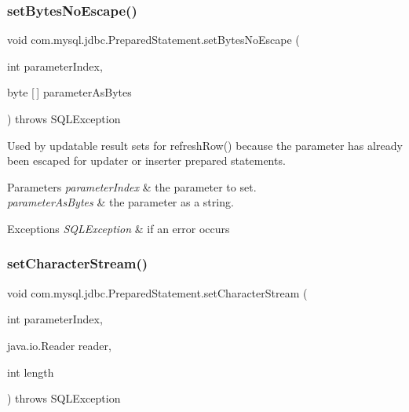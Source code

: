 \mbox{\label{classcom_1_1mysql_1_1jdbc_1_1_prepared_statement_ae6f08c22768c05382f813b02cfdb81e8}} 
\subsubsection{\texorpdfstring{set\+Bytes\+No\+Escape()}{setBytesNoEscape()}}
{\footnotesize\ttfamily void com.\+mysql.\+jdbc.\+Prepared\+Statement.\+set\+Bytes\+No\+Escape (\begin{DoxyParamCaption}\item[{int}]{parameter\+Index,  }\item[{byte \mbox{[}$\,$\mbox{]}}]{parameter\+As\+Bytes }\end{DoxyParamCaption}) throws S\+Q\+L\+Exception\hspace{0.3cm}{\ttfamily [protected]}}

Used by updatable result sets for refresh\+Row() because the parameter has already been escaped for updater or inserter prepared statements.


\begin{DoxyParams}{Parameters}
{\em parameter\+Index} & the parameter to set. \\
\hline
{\em parameter\+As\+Bytes} & the parameter as a string.\\
\hline
\end{DoxyParams}

\begin{DoxyExceptions}{Exceptions}
{\em S\+Q\+L\+Exception} & if an error occurs \\
\hline
\end{DoxyExceptions}
\mbox{\label{classcom_1_1mysql_1_1jdbc_1_1_prepared_statement_a3653eef6d3825664b0dd3f0adbe8288c}} 
\subsubsection{\texorpdfstring{set\+Character\+Stream()}{setCharacterStream()}}
{\footnotesize\ttfamily void com.\+mysql.\+jdbc.\+Prepared\+Statement.\+set\+Character\+Stream (\begin{DoxyParamCaption}\item[{int}]{parameter\+Index,  }\item[{java.\+io.\+Reader}]{reader,  }\item[{int}]{length }\end{DoxyParamCaption}) throws S\+Q\+L\+Exception}

